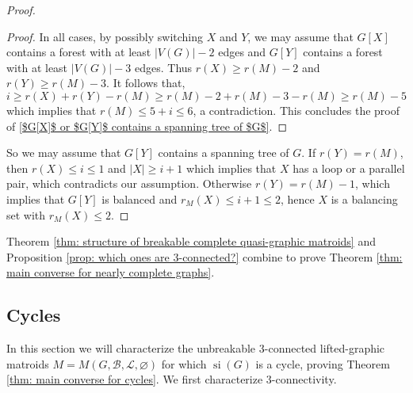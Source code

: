 \documentclass[12pt]{article}
\theoremstyle{definition}
\theoremstyle{plain} %
\newcommand{\cB}{\mathcal{B}}
\newcommand{\cL}{\mathcal{L}}
\DeclareMathOperator{\si}{si}
\begin{document}
\begin{proof}
\begin{proof}
In all cases, by possibly switching $X$ and $Y$, we may assume that $G[X]$ contains a forest with at least $\lvert V(G)\rvert-2$ edges and $G[Y]$ contains a forest with at least $\lvert V(G)\rvert-3$ edges. Thus $r(X) \ge r(M) - 2$ and $r(Y) \ge r(M) - 3$. It follows that, 
\[i \geq  r(X)+r(Y)-r(M) \geq r(M)-2+r(M)-3-r(M) \geq r(M)-5\]
which implies that $r(M) \le 5 + i \le 6$, a contradiction. This concludes the proof of \ref{$G[X]$ or $G[Y]$ contains a spanning tree of $G$}.
\end{proof}

So we may assume that $G[Y]$ contains a spanning tree of $G$. If $r(Y) = r(M)$, then $r(X) \le i \leq 1$ and $|X| \ge i + 1$ which implies that $X$ has a loop or a parallel pair, which contradicts our assumption.
Otherwise $r(Y) = r(M) - 1$, which implies that $G[Y]$ is balanced and $r_M(X)\leq i+1\leq 2$, hence $X$ is a balancing set with $r_M(X)\leq2$. 
\end{proof}


Theorem \ref{thm: structure of breakable complete quasi-graphic matroids} and Proposition \ref{prop: which ones are 3-connected?} combine to prove Theorem \ref{thm: main converse for nearly complete graphs}.


\subsection{Cycles}\label{sec: cycles}

In this section we will characterize the unbreakable $3$-connected lifted-graphic matroids $M = M(G, \cB, \cL, \varnothing)$ for which $\si(G)$ is a cycle, proving Theorem \ref{thm: main converse for cycles}.
We first characterize $3$-connectivity.
\end{document}
